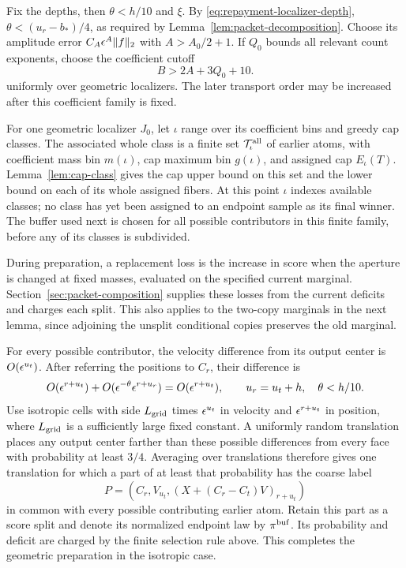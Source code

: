 Fix the depths, then \(\theta<h/10\) and \(\xi\).  By
\eqref{eq:repayment-localizer-depth},
\(\theta<(u_r-b_*)/4\), as required by
Lemma~\ref{lem:packet-decomposition}.  Choose its amplitude error
\(C_A\epsilon^A\|f\|_2\) with \(A>A_0/2+1\).  If \(Q_0\) bounds
all relevant count exponents, choose the coefficient cutoff
\begin{equation}
 B>2A+3Q_0+10 .
 \label{eq:repayment-coefficient-cutoff}
\end{equation}
uniformly over geometric localizers.  The later transport order
may be increased after this coefficient family is fixed.

For one geometric localizer \(J_0\), let \(\iota\) range over its
coefficient bins and greedy cap classes.  The associated whole class
is a finite set \(\mathcal T_\iota^{\rm all}\) of earlier atoms,
with coefficient mass bin \(m(\iota)\), cap maximum bin \(g(\iota)\),
and assigned cap \(E_\iota(T)\).  Lemma~\ref{lem:cap-class} gives
the cap upper bound on this set and the lower bound on each of its
whole assigned fibers.  At this point \(\iota\) indexes available
classes; no class has yet been assigned to an endpoint sample as its
final winner.  The buffer used next is chosen for all possible
contributors in this finite family, before any of its classes is
subdivided.

During preparation, a replacement loss is the increase in score
when the aperture is changed at fixed masses, evaluated on the
specified current marginal.  Section~\ref{sec:packet-composition}
supplies these losses from the current deficits and charges each
split.  This also applies to the two-copy marginals in the next
lemma, since adjoining the unsplit conditional copies preserves
the old marginal.

For every possible contributor, the velocity difference from its
output center is \(O(\epsilon^{u_t})\).  After referring the positions
to \(C_r\), their difference is
\[
 O(\epsilon^{r+u_t})+
 O(\epsilon^{-\theta}\epsilon^{r+u_r})
       =O(\epsilon^{r+u_t}),
 \qquad u_r=u_t+h,\quad \theta<h/10.
\]
Use isotropic cells with side \(L_{\rm grid}\) times
\(\epsilon^{u_t}\) in velocity and \(\epsilon^{r+u_t}\) in position,
where \(L_{\rm grid}\) is a sufficiently large fixed constant.
A uniformly random translation places any output center farther
than these possible differences from every face with probability
at least \(3/4\).  Averaging over translations therefore gives
one translation for which a part of at least that probability has
the coarse label
\[
 P=(C_r,V_{u_t},(X+(C_r-C_t)V)_{r+u_t})
\]
in common with every possible contributing earlier atom.
Retain this part as a score split and denote its normalized
endpoint law by \(\pi^{\rm buf}\).  Its probability and deficit
are charged by the finite selection rule above.  This completes
the geometric preparation in the isotropic case.

